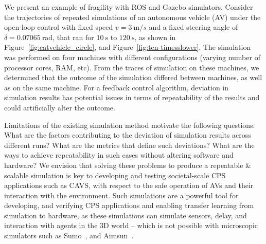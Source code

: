 \documentclass[aps,pra,twocolumn,notitlepage,nofootinbib,superscriptaddress]{revtex4-1}
\begin{document}
We present an example of fragility with ROS and Gazebo simulators. Consider the trajectories of repeated simulations of an autonomous vehicle (AV) under the open-loop control with fixed speed $v=3~\textrm{m/}s$ and a fixed steering angle of $\delta=0.07065~\textrm{rad}$, that ran for $10~\textrm
{s}$ to $120~\textrm{s}$, 
as shown in Figure~\ref{fig:catvehicle_circle}, and Figure~\ref{fig:ten-timesslower}. The simulation was performed on four machines with different configurations (varying number of processor cores, RAM, etc).
From the traces of simulation on these machines, we determined that the outcome of the simulation differed between machines, as well as on the same machine. For a feedback control algorithm, deviation in simulation results has potential issues in terms of repeatability of the results and could artificially alter the outcome.

Limitations of the existing simulation method motivate the following questions: What are the factors contributing to the deviation of simulation results across different runs? What are the metrics that define such deviations? What are the ways to achieve repeatability in such cases without altering software and hardware? We envision that solving these problems to produce a repeatable \& scalable simulation is key to developing and testing societal-scale CPS applications such as CAVS, with respect to the safe operation of AVs and their interaction with the environment. Such simulations are a powerful tool for developing, and verifying CPS applications and enabling transfer learning from simulation to hardware, as these simulations can simulate sensors, delay, and interaction with agents in the 3D world -- which is not possible with microscopic simulators such as Sumo~\cite{lopez2018microscopic}, and Aimsun~\cite{casas2010traffic}. 

\end{document}
